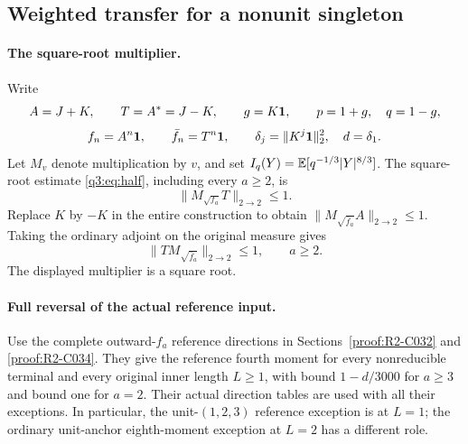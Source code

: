 \subsection{Weighted transfer for a nonunit singleton}\label{proof:Q5-E008-singleton}
\paragraph{The square-root multiplier.}
Write
\[
A=J+K,\qquad T=A^*=J-K,\qquad g=K\mathbf1,
\qquad p=1+g,\quad q=1-g,
\]
\[
f_n=A^n\mathbf1,\qquad\bar f_n=T^n\mathbf1,
\qquad\delta_j=\lVert K^j\mathbf1\rVert_2^2,\quad d=\delta_1.
\]
Let \(M_v\) denote multiplication by \(v\), and set
\(I_q(Y)=\mathbb E[q^{-1/3}|Y|^{8/3}]\). The square-root estimate
\eqref{q3:eq:half}, including every \(a\ge2\), is
\[
\lVert M_{\sqrt{f_a}}T\rVert_{2\to2}\le1.
\]
Replace \(K\) by \(-K\) in the entire construction to obtain
\(\lVert M_{\sqrt{\bar f_a}}A\rVert_{2\to2}\le1\).
Taking the ordinary adjoint on the original measure gives
\[
\boxed{\lVert T M_{\sqrt{\bar f_a}}\rVert_{2\to2}\le1,
\qquad a\ge2.}
\tag{E8.10.1}
\]
The displayed multiplier is a square root.

\paragraph{Full reversal of the actual reference input.}
Use the complete outward-\(f_a\) reference directions in
Sections~\ref{proof:R2-C032} and \ref{proof:R2-C034}. They give the
reference fourth moment for every nonreducible terminal and every
original inner length \(L\ge1\), with bound \(1-d/3000\) for \(a\ge3\)
and bound one for \(a=2\). Their actual direction tables are used with
all their exceptions. In particular, the unit-\((1,\allowbreak 2,\allowbreak 3)\) reference
exception is at \(L=1\); the ordinary unit-anchor eighth-moment exception at \(L=2\)
has a different role.

